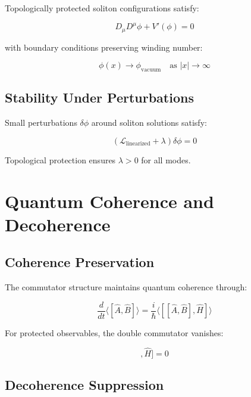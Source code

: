 \documentclass[12pt,a4paper]{article}
\begin{document}
Topologically protected soliton configurations satisfy:

\begin{equation}
D_\mu D^\mu \phi + V'(\phi) = 0
\end{equation}

with boundary conditions preserving winding number:

\begin{equation}
\phi(x) \rightarrow \phi_{\text{vacuum}} \quad \text{as } |x| \rightarrow \infty
\end{equation}

\subsection{Stability Under Perturbations}

Small perturbations $\delta\phi$ around soliton solutions satisfy:

\begin{equation}
\left(\mathcal{L}_{\text{linearized}} + \lambda\right) \delta\phi = 0
\end{equation}

Topological protection ensures $\lambda > 0$ for all modes.

\section{Quantum Coherence and Decoherence}

\subsection{Coherence Preservation}

The commutator structure maintains quantum coherence through:

\begin{equation}
\frac{d}{dt}\langle[\hat{A}, \hat{B}]\rangle = \frac{i}{\hbar}\langle[[\hat{A}, \hat{B}], \hat{H}]\rangle
\end{equation}

For protected observables, the double commutator vanishes:

\begin{equation}
[[\hat{A}_{\text{protected}}, \hat{B}_{\text{protected}}], \hat{H}] = 0
\end{equation}

\subsection{Decoherence Suppression}
\end{document}
